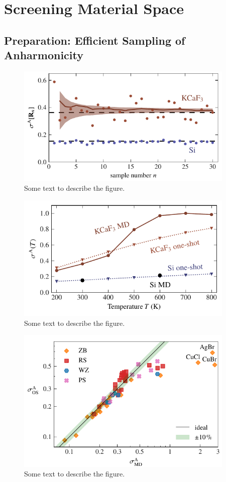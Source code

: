 \section{Screening Material Space}

\subsection{Preparation: Efficient Sampling of Anharmonicity}

\begin{figure}
	\includegraphics[width=4.1in]{./data/plots/anharmonicity/7_sampling/convergence_sigma_MC.pdf}
	\caption{
		Some text to describe the figure.
	}
\end{figure}

\begin{figure}
	\includegraphics[width=4.1in]{./data/plots/anharmonicity/7_sampling/sigma_temp_one_shot.pdf}
	\caption{
		Some text to describe the figure.
	}
\end{figure}

\begin{figure}
	\includegraphics[width=4.1in]{./data/plots/anharmonicity/8_screening/sigma_os_md.pdf}
	\caption{
		Some text to describe the figure.
	}
\end{figure}

